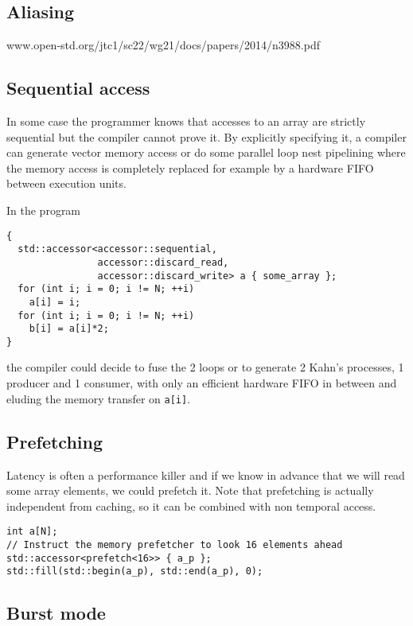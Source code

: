 \documentclass[a4paper]{article}
\begin{document}
\subsection{Aliasing}
\label{sec:aliasing}

  www.open-std.org/jtc1/sc22/wg21/docs/papers/2014/n3988.pdf


\subsection{Sequential access}
\label{sec:sequential-access}

In some case the programmer knows that accesses to an array are
strictly sequential but the compiler cannot prove it. By explicitly
specifying it, a compiler can generate vector memory access or do some
parallel loop nest pipelining where the memory access is completely
replaced for example by a hardware FIFO between execution units.

In the program
\begin{lstlisting}
{
  std::accessor<accessor::sequential,
                accessor::discard_read,
                accessor::discard_write> a { some_array };
  for (int i; i = 0; i != N; ++i)
    a[i] = i;
  for (int i; i = 0; i != N; ++i)
    b[i] = a[i]*2;
}
\end{lstlisting}
the compiler could decide to fuse the 2 loops or to generate 2 Kahn's
processes, 1 producer and 1 consumer, with only an efficient hardware
FIFO in between and eluding the memory transfer on \lstinline|a[i]|.


\subsection{Prefetching}
\label{sec:prefetching}

Latency is often a performance killer and if we know in advance that
we will read some array elements, we could prefetch it. Note that
prefetching is actually independent from caching, so it can be
combined with non temporal access.

\begin{lstlisting}
int a[N];
// Instruct the memory prefetcher to look 16 elements ahead
std::accessor<prefetch<16>> { a_p };
std::fill(std::begin(a_p), std::end(a_p), 0);
\end{lstlisting}


\subsection{Burst mode}
\label{sec:burst-mode}
\end{document}
